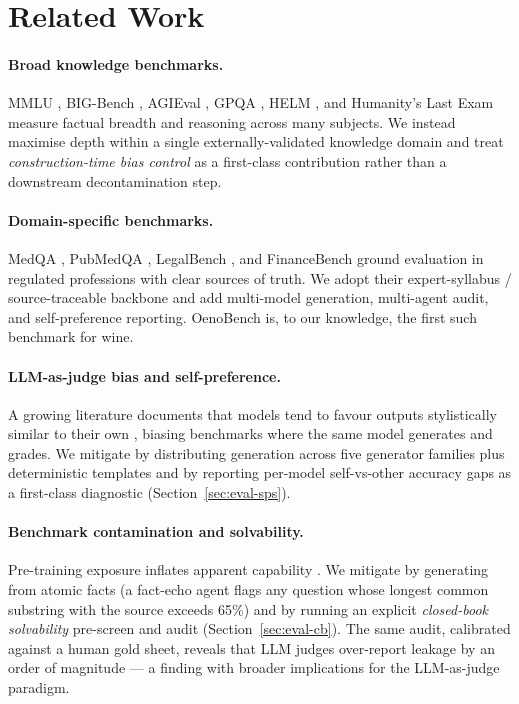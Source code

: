 \section{Related Work}
\label{sec:related}

\paragraph{Broad knowledge benchmarks.} MMLU
\citep{hendrycks2021mmlu}, BIG-Bench \citep{srivastava2023bigbench},
AGIEval \citep{zhong2024agieval}, GPQA \citep{rein2024gpqa}, HELM
\citep{liang2023helm}, and Humanity's Last Exam \citep{phan2025hle}
measure factual breadth and reasoning across many subjects. We instead
maximise depth within a single externally-validated knowledge domain
and treat \emph{construction-time bias control} as a first-class
contribution rather than a downstream decontamination step.

\paragraph{Domain-specific benchmarks.} MedQA
\citep{jin2021medqa}, PubMedQA \citep{jin2019pubmedqa}, LegalBench
\citep{guha2023legalbench}, and FinanceBench
\citep{islam2023financebench} ground evaluation in regulated
professions with clear sources of truth. We adopt their
expert-syllabus / source-traceable backbone and add multi-model
generation, multi-agent audit, and self-preference reporting.
OenoBench is, to our knowledge, the first such benchmark for wine.

\paragraph{LLM-as-judge bias and self-preference.} A growing literature
documents that models tend to favour outputs stylistically similar to
their own \citep{panickssery2024selfpref, zheng2023judging,
sharma2024sycophancy}, biasing benchmarks where the same model
generates and grades. We mitigate by distributing generation across
five generator families plus deterministic templates and by reporting
per-model self-vs-other accuracy gaps as a first-class diagnostic
(Section~\ref{sec:eval-sps}).

\paragraph{Benchmark contamination and solvability.} Pre-training
exposure inflates apparent capability \citep{sainz2023contamination,
magar2022contamination, dodge2021documenting}. We mitigate by
generating from atomic facts (a fact-echo agent flags any question
whose longest common substring with the source exceeds 65\%) and by
running an explicit \emph{closed-book solvability} pre-screen and
audit (Section~\ref{sec:eval-cb}). The same audit, calibrated against
a human gold sheet, reveals that LLM judges over-report leakage by an
order of magnitude --- a finding with broader implications for the
LLM-as-judge paradigm.

